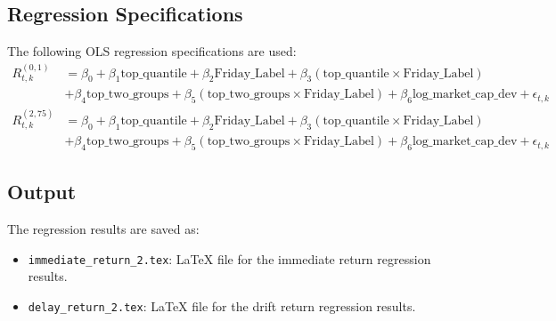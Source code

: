 \documentclass{article}
\begin{document}
\subsection*{Regression Specifications}
The following OLS regression specifications are used:
\begin{align*}
    R^{(0,1)}_{t,k} &= \beta_0 + \beta_1 \text{top\_quantile} + \beta_2 \text{Friday\_Label} + \beta_3 (\text{top\_quantile} \times \text{Friday\_Label}) \\
    &+ \beta_4 \text{top\_two\_groups} + \beta_5 (\text{top\_two\_groups} \times \text{Friday\_Label}) + \beta_6 \text{log\_market\_cap\_dev} + \epsilon_{t,k} \\
    R^{(2,75)}_{t,k} &= \beta_0 + \beta_1 \text{top\_quantile} + \beta_2 \text{Friday\_Label} + \beta_3 (\text{top\_quantile} \times \text{Friday\_Label}) \\
    &+ \beta_4 \text{top\_two\_groups} + \beta_5 (\text{top\_two\_groups} \times \text{Friday\_Label}) + \beta_6 \text{log\_market\_cap\_dev} + \epsilon_{t,k}
\end{align*}

\subsection*{Output}
The regression results are saved as:
\begin{itemize}
    \item \texttt{immediate\_return\_2.tex}: LaTeX file for the immediate return regression results.
    \item \texttt{delay\_return\_2.tex}: LaTeX file for the drift return regression results.
\end{itemize}
\end{document}
